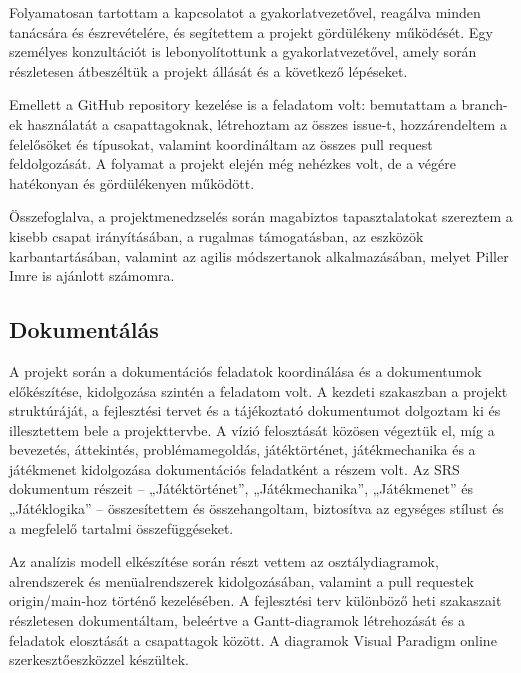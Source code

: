 \documentclass[12pt,a4paper]{article}
\begin{document}
Folyamatosan tartottam a kapcsolatot a gyakorlatvezetővel, reagálva minden tanácsára és észrevételére, és segítettem a projekt gördülékeny működését. Egy személyes konzultációt is lebonyolítottunk a gyakorlatvezetővel, amely során részletesen átbeszéltük a projekt állását és a következő lépéseket.  

Emellett a GitHub repository kezelése is a feladatom volt: bemutattam a branch-ek használatát a csapattagoknak, létrehoztam az összes issue-t, hozzárendeltem a felelősöket és típusokat, valamint koordináltam az összes pull request feldolgozását. A folyamat a projekt elején még nehézkes volt, de a végére hatékonyan és gördülékenyen működött.  

Összefoglalva, a projektmenedzselés során magabiztos tapasztalatokat szereztem a kisebb csapat irányításában, a rugalmas támogatásban, az eszközök karbantartásában, valamint az agilis módszertanok alkalmazásában, melyet Piller Imre is ajánlott számomra.

\subsection{Dokumentálás}

A projekt során a dokumentációs feladatok koordinálása és a dokumentumok előkészítése, kidolgozása szintén a feladatom volt. A kezdeti szakaszban a projekt struktúráját, a fejlesztési tervet és a tájékoztató dokumentumot dolgoztam ki és illesztettem bele a projekttervbe. A vízió felosztását közösen végeztük el, míg a bevezetés, áttekintés, problémamegoldás, játéktörténet, játékmechanika és a játékmenet kidolgozása dokumentációs feladatként a részem volt. Az SRS dokumentum részeit – „Játéktörténet”, „Játékmechanika”, „Játékmenet” és „Játéklogika” – összesítettem és összehangoltam, biztosítva az egységes stílust és a megfelelő tartalmi összefüggéseket.

Az analízis modell elkészítése során részt vettem az osztálydiagramok, alrendszerek és menüalrendszerek kidolgozásában, valamint a pull requestek origin/main-hoz történő kezelésében. A fejlesztési terv különböző heti szakaszait részletesen dokumentáltam, beleértve a Gantt-diagramok létrehozását és a feladatok elosztását a csapattagok között. A diagramok Visual Paradigm \cite{visualparadigm_online} online szerkesztőeszközzel készültek.
\end{document}
